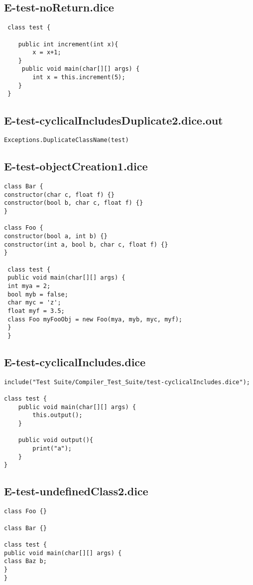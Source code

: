 \subsection{E-test-noReturn.dice}
\begin{verbatim}
 class test {

 	public int increment(int x){
 		x = x+1;
 	}
	 public void main(char[][] args) {
		int x = this.increment(5);
 	}
 }
\end{verbatim}
\pagebreak
\subsection{E-test-cyclicalIncludesDuplicate2.dice.out}
\begin{verbatim}
Exceptions.DuplicateClassName(test)

\end{verbatim}
\pagebreak
\subsection{E-test-objectCreation1.dice}
\begin{verbatim}
class Bar {
constructor(char c, float f) {}
constructor(bool b, char c, float f) {}
}

class Foo {
constructor(bool a, int b) {}
constructor(int a, bool b, char c, float f) {}
}

 class test {
 public void main(char[][] args) {
 int mya = 2;
 bool myb = false;
 char myc = 'z';
 float myf = 3.5;
 class Foo myFooObj = new Foo(mya, myb, myc, myf);
 }
 }
\end{verbatim}
\pagebreak
\subsection{E-test-cyclicalIncludes.dice}
\begin{verbatim}
include("Test Suite/Compiler_Test_Suite/test-cyclicalIncludes.dice");

class test {
	public void main(char[][] args) {
        this.output();
	}

	public void output(){
		print("a");
	}
}

\end{verbatim}
\pagebreak
\subsection{E-test-undefinedClass2.dice}
\begin{verbatim}
class Foo {}

class Bar {}

class test {
public void main(char[][] args) {
class Baz b;
}
}

\end{verbatim}
\pagebreak
